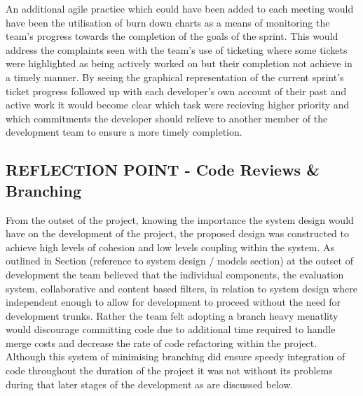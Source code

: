 \documentclass{l3proj}
\begin{document}
An additional agile practice which could have been added to each meeting would have been the utilisation of burn down charts as a means of monitoring the team's progress towards the completion of the goals of the sprint. This would address the complaints seen with the team's use of ticketing where some tickets were highlighted as being actively worked on but their completion not achieve in a timely manner. By seeing the graphical representation of the current sprint's ticket progress followed up with each developer's own account of their past and active work it would become clear which task were recieving higher priority and which commitments the developer should relieve to another member of the development team to ensure a more timely completion.


\subsection{REFLECTION POINT - Code Reviews \& Branching}
\label{sec:codereviewbranch}



From the outset of the project, knowing the importance the system design would have on the development of the project, the proposed design was constructed to achieve high levels of cohesion and low levels coupling within the system. As outlined in Section (reference to system design / models section) at the outset of development the team believed that the individual components, the evaluation system, collaborative and content based filters, in relation to system design where independent enough to allow for development to proceed without the need for development trunks. Rather the team felt adopting a branch heavy menatlity would discourage committing code due to additional time required to handle merge costs and decrease the rate of code refactoring within the project. Although this system of minimising branching did ensure speedy integration of code throughout the duration of the project it was not without its problems during that later stages of the development as are discussed below.
\end{document}
